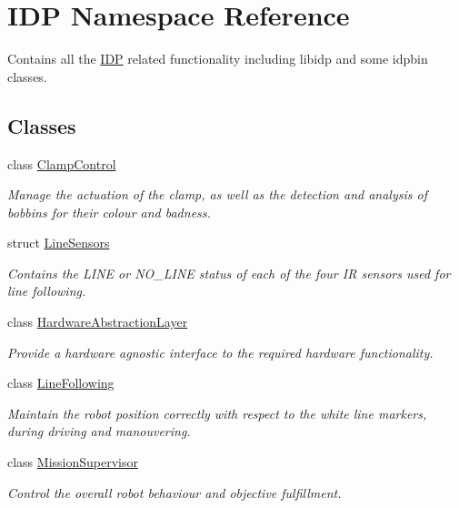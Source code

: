 \hypertarget{namespaceIDP}{
\section{IDP Namespace Reference}
\label{namespaceIDP}
}


Contains all the \hyperlink{namespaceIDP}{IDP} related functionality including libidp and some idpbin classes.  


\subsection*{Classes}
\begin{DoxyCompactItemize}
\item 
class \hyperlink{classIDP_1_1ClampControl}{ClampControl}
\begin{DoxyCompactList}\small\item\em Manage the actuation of the clamp, as well as the detection and analysis of bobbins for their colour and badness. \item\end{DoxyCompactList}\item 
struct \hyperlink{structIDP_1_1LineSensors}{LineSensors}
\begin{DoxyCompactList}\small\item\em Contains the LINE or NO\_\-LINE status of each of the four IR sensors used for line following. \item\end{DoxyCompactList}\item 
class \hyperlink{classIDP_1_1HardwareAbstractionLayer}{HardwareAbstractionLayer}
\begin{DoxyCompactList}\small\item\em Provide a hardware agnostic interface to the required hardware functionality. \item\end{DoxyCompactList}\item 
class \hyperlink{classIDP_1_1LineFollowing}{LineFollowing}
\begin{DoxyCompactList}\small\item\em Maintain the robot position correctly with respect to the white line markers, during driving and manouvering. \item\end{DoxyCompactList}\item 
class \hyperlink{classIDP_1_1MissionSupervisor}{MissionSupervisor}
\begin{DoxyCompactList}\small\item\em Control the overall robot behaviour and objective fulfillment. \item\end{DoxyCompactList}\item 

\end{DoxyCompactItemize}
